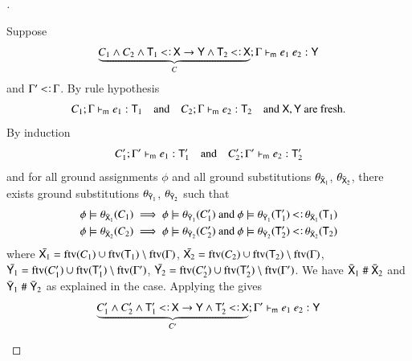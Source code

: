\documentclass{report}
\begin{document}
\begin{proof}[]
\begin{indcase}{\decabs}
    \end{indcase}
    \begin{indcase}{\sdapp}
      Suppose
      \begin{displaymath}
        \underbrace{C_1\land C_2\land\type{T}_1\subtype\type{X}\fun\type{Y}\land\type{T}_2\subtype\type{X}}_C;\Gamma\entailsm e_1\ e_2:\type{Y}
      \end{displaymath}
      and $\Gamma'\subtype\Gamma$. By rule hypothesis
      \begin{displaymath}
        C_1;\Gamma\vdash_\textsf{m} e_1:\textsf{T}_1\quad\textrm{and}\quad
        C_2;\Gamma\vdash_\textsf{m} e_2:\textsf{T}_2\quad\textrm{and }
        \textsf{X},\textsf{Y}\textrm{ are fresh.}
      \end{displaymath}
      By induction
      \begin{displaymath}
        C_1';\Gamma'\vdash_\textsf{m} e_1:\textsf{T}_1'\quad\textrm{and}\quad
        C_2';\Gamma'\vdash_\textsf{m} e_2:\textsf{T}_2'
      \end{displaymath}
      and for all
      ground assignments $\phi$ and all ground substitutions $\theta_{\bar{\textsf{X}}_1}$, $\theta_{\bar{\textsf{X}}_2}$,
      there exists ground substitutions $\theta_{\bar{\textsf{Y}}_1}$, $\theta_{\bar{\textsf{Y}}_2}$ such that
      \begin{eqnarray}
        \phi\csat\theta_{\bar{\type{X}}_1}(C_1) \implies
        \phi\csat\theta_{\bar{\type{Y}}_1}(C_1')\textrm{ and }
        \phi\csat\theta_{\bar{\type{Y}}_1}(\type{T}_1')\subtype\theta_{\bar{\type{X}}_1}(\type{T}_1)\nonumber\\
        \phi\csat\theta_{\bar{\type{X}}_2}(C_2) \implies
        \phi\csat\theta_{\bar{\type{Y}}_2}(C_2')\textrm{ and }
        \phi\csat\theta_{\bar{\type{Y}}_2}(\type{T}_2')\subtype\theta_{\bar{\type{X}}_2}(\type{T}_2)\nonumber
      \end{eqnarray}
      where $\bar{\textsf{X}_1}=\mathop{\rm ftv}\nolimits(C_1)\cup\mathop{\rm ftv}\nolimits(\textsf{T}_1)\setminus\mathop{\rm ftv}\nolimits(\Gamma)$,
      $\bar{\textsf{X}_2}=\mathop{\rm ftv}\nolimits(C_2)\cup\mathop{\rm ftv}\nolimits(\textsf{T}_2)\setminus\mathop{\rm ftv}\nolimits(\Gamma)$,
      $\bar{\textsf{Y}_1}=\mathop{\rm ftv}\nolimits(C_1')\cup\mathop{\rm ftv}\nolimits(\textsf{T}_1')\setminus\mathop{\rm ftv}\nolimits(\Gamma')$,
      $\bar{\textsf{Y}_2}=\mathop{\rm ftv}\nolimits(C_2')\cup\mathop{\rm ftv}\nolimits(\textsf{T}_2')\setminus\mathop{\rm ftv}\nolimits(\Gamma')$.
      We have $\bar{\textsf{X}}_1\mathrel{\#}\bar{\textsf{X}}_2$ and $\bar{\textsf{Y}}_1\mathrel{\#}\bar{\textsf{Y}}_2$
      as explained in the \sdrec case. Applying the \sdapp gives
      \begin{displaymath}
        \underbrace{C_1'\land C_2'\land \type{T}_1'\subtype\type{X}\fun\type{Y}\land\type{T}_2'\subtype\type{X}}_{C'};\Gamma'\entailsm e_1\ e_2:\type{Y}

\end{displaymath}
\end{indcase}
\end{proof}
\end{document}
